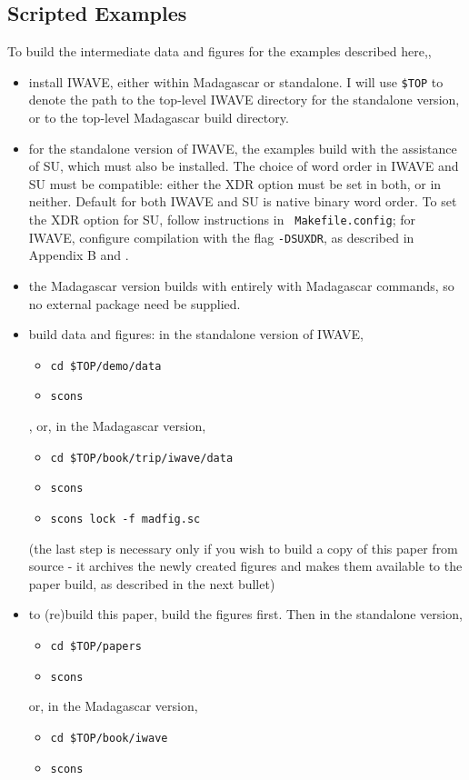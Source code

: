 \subsection{Scripted Examples}
To build the intermediate data and figures for  the examples described
here,,
\begin{itemize}
\item install IWAVE, either within Madagascar or standalone. I will use  {\tt \$TOP} to denote
  the path to the top-level IWAVE directory for the standalone
  version, or to the top-level Madagascar build directory.
\item for the standalone version of IWAVE, the examples build with the
  assistance of SU, which must also be installed. The choice of word
  order in IWAVE and SU must be compatible: either the XDR option must
  be set in both, or in neither. Default for both IWAVE and SU is native binary
  word order. To set the XDR option for SU, follow instructions in {\tt
    Makefile.config}; for IWAVE, configure compilation with the flag
  {\tt -DSUXDR}, as described in Appendix B and \cite[]{IWAVE}.
\item the Madagascar version builds with entirely with Madagascar commands,
  so no external package need be supplied.
\item build data and figures: in the standalone version of IWAVE,
\begin{itemize}
  \item {\tt cd \$TOP/demo/data}
\item {\tt scons}
\end{itemize},
or, in the Madagascar version,
\begin{itemize}
\item {\tt cd \$TOP/book/trip/iwave/data}
\item {\tt scons}
\item {\tt scons lock -f madfig.sc}
\end{itemize}
(the last step is necessary only if you wish to build a copy of this
paper from source - it archives the newly created figures and makes
them available to the paper build, as described in the next bullet)
\item to (re)build this paper, build the figures first. Then in the standalone version,
\begin{itemize}
\item {\tt cd \$TOP/papers}
\item {\tt scons}
\end{itemize} 
or, in the Madagascar version,
\begin{itemize}
\item {\tt cd \$TOP/book/iwave}
\item {\tt scons}
\end{itemize}

\end{itemize}
